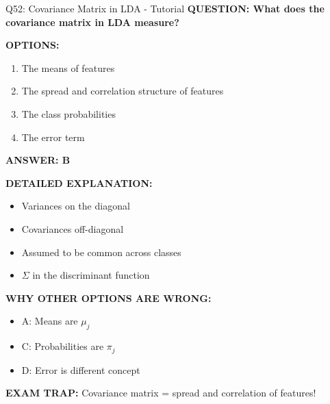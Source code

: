 \documentclass[8pt]{beamer}
\begin{document}
\begin{frame}{Q52: Covariance Matrix in LDA - Tutorial}
	\fontsize{6.5}{7.5}\selectfont
	\textbf{QUESTION: What does the covariance matrix in LDA measure?}
	
	\vspace{0.1cm}
	\textbf{OPTIONS:}
	\begin{enumerate}
		\item The means of features
		\item The spread and correlation structure of features
		\item The class probabilities
		\item The error term
	\end{enumerate}
	
	\vspace{0.1cm}
	\textcolor{myblue}{\textbf{ANSWER: B}}
	
	\vspace{0.1cm}
	\textbf{DETAILED EXPLANATION:}
	\begin{itemize}
		\item Variances on the diagonal
		\item Covariances off-diagonal
		\item Assumed to be common across classes
		\item $\Sigma$ in the discriminant function
	\end{itemize}
	
	\vspace{0.1cm}
	\textcolor{myred}{\textbf{WHY OTHER OPTIONS ARE WRONG:}}
	\begin{itemize}
		\item \textcolor{myred}{A:} Means are $\mu_j$
		\item \textcolor{myred}{C:} Probabilities are $\pi_j$
		\item \textcolor{myred}{D:} Error is different concept
	\end{itemize}
	
	\textcolor{myred}{\textbf{EXAM TRAP:}} Covariance matrix = \textcolor{myblue}{spread and correlation} of features!
\end{frame}
\end{document}
